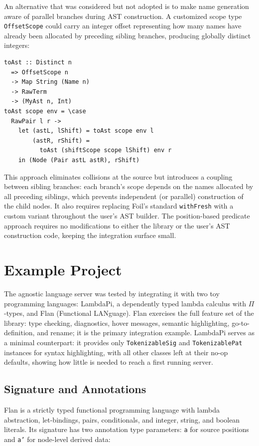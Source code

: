 An alternative that was considered but not adopted is to make name generation aware of parallel branches during AST construction.
A customized scope type \texttt{OffsetScope} could carry an integer offset representing how many names have already been allocated by preceding sibling branches, producing globally distinct integers:

\begin{verbatim}
toAst :: Distinct n
  => OffsetScope n
  -> Map String (Name n)
  -> RawTerm
  -> (MyAst n, Int)
toAst scope env = \case
  RawPair l r ->
    let (astL, lShift) = toAst scope env l
        (astR, rShift) =
          toAst (shiftScope scope lShift) env r
    in (Node (Pair astL astR), rShift)
\end{verbatim}

This approach eliminates collisions at the source but introduces a coupling between sibling branches: each branch's scope depends on the names allocated by all preceding siblings, which prevents independent (or parallel) construction of the child nodes.
It also requires replacing Foil's standard \texttt{withFresh} with a custom variant throughout the user's AST builder.
The position-based predicate approach requires no modifications to either the library or the user's AST construction code, keeping the integration surface small.

\section{Example Project}

The agnostic language server was tested by integrating it with two toy programming languages: LambdaPi, a dependently typed lambda calculus with $\Pi$-types, and Flan (Functional LANguage).
Flan exercises the full feature set of the library: type checking, diagnostics, hover messages, semantic highlighting, go-to-definition, and rename; it is the primary integration example.
LambdaPi serves as a minimal counterpart: it provides only \texttt{TokenizableSig} and \texttt{TokenizablePat} instances for syntax highlighting, with all other classes left at their no-op defaults, showing how little is needed to reach a first running server.

\subsection{Signature and Annotations}

Flan is a strictly typed functional programming language with lambda abstraction, let-bindings, pairs, conditionals, and integer, string, and boolean literals.
Its signature has two annotation type parameters: \texttt{a} for source positions and \texttt{a'} for node-level derived data:

